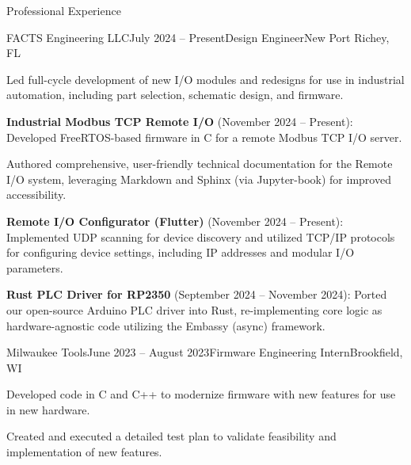 \documentclass[
	11pt, %
]{resume} %
\begin{document}
\begin{rSection}{Professional Experience}

    \begin{rSubsection}{FACTS Engineering LLC}{July 2024 -- Present}{Design Engineer}{New Port Richey, FL}
		\item Led full-cycle development of new I/O modules and redesigns for use in industrial automation, including part selection, schematic design, and firmware.
		\item \textbf{Industrial Modbus TCP Remote I/O} (November 2024 -- Present): Developed FreeRTOS-based firmware in C for a remote Modbus TCP I/O server.
		\begin{rSubItems}
			\item Authored comprehensive, user-friendly technical documentation for the Remote I/O system, 
			leveraging Markdown and Sphinx (via Jupyter-book) for improved accessibility.
		\end{rSubItems}
		\item \textbf{Remote I/O Configurator (Flutter)} (November 2024 -- Present): Implemented UDP scanning for device discovery and utilized TCP/IP protocols for configuring device settings, including IP addresses and modular I/O parameters.
        \item \textbf{Rust PLC Driver for RP2350} (September 2024 -- November 2024): Ported our open-source Arduino PLC driver into Rust, re-implementing core logic as hardware-agnostic code utilizing the Embassy (async) framework.
	\end{rSubsection}


	\begin{rSubsection}{Milwaukee Tools}{June 2023 -- August 2023}{Firmware Engineering Intern}{Brookfield, WI}
		\item Developed code in C and C++ to modernize firmware with new features for use in new hardware.
		\item Created and executed a detailed test plan to validate feasibility and implementation of new features.
	\end{rSubsection}
    
\end{rSection}

\end{document}
